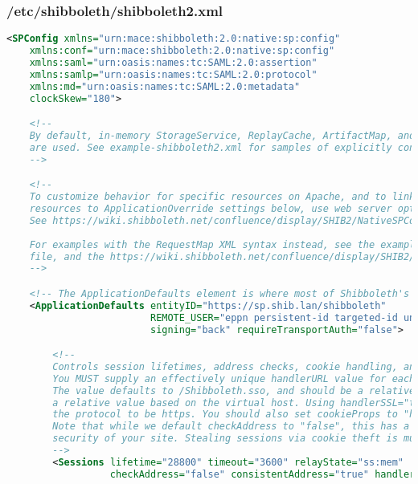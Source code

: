 \subsubsection{/etc/shibboleth/shibboleth2.xml}
\begin{lstlisting}[language=xml]
<SPConfig xmlns="urn:mace:shibboleth:2.0:native:sp:config"
    xmlns:conf="urn:mace:shibboleth:2.0:native:sp:config"
    xmlns:saml="urn:oasis:names:tc:SAML:2.0:assertion"
    xmlns:samlp="urn:oasis:names:tc:SAML:2.0:protocol"    
    xmlns:md="urn:oasis:names:tc:SAML:2.0:metadata"
    clockSkew="180">

    <!--
    By default, in-memory StorageService, ReplayCache, ArtifactMap, and SessionCache
    are used. See example-shibboleth2.xml for samples of explicitly configuring them.
    -->

    <!--
    To customize behavior for specific resources on Apache, and to link vhosts or
    resources to ApplicationOverride settings below, use web server options/commands.
    See https://wiki.shibboleth.net/confluence/display/SHIB2/NativeSPConfigurationElements for help.
    
    For examples with the RequestMap XML syntax instead, see the example-shibboleth2.xml
    file, and the https://wiki.shibboleth.net/confluence/display/SHIB2/NativeSPRequestMapHowTo topic.
    -->

    <!-- The ApplicationDefaults element is where most of Shibboleth's SAML bits are defined. -->
    <ApplicationDefaults entityID="https://sp.shib.lan/shibboleth"
                         REMOTE_USER="eppn persistent-id targeted-id uniqueID"
                         signing="back" requireTransportAuth="false">

        <!--
        Controls session lifetimes, address checks, cookie handling, and the protocol handlers.
        You MUST supply an effectively unique handlerURL value for each of your applications.
        The value defaults to /Shibboleth.sso, and should be a relative path, with the SP computing
        a relative value based on the virtual host. Using handlerSSL="true", the default, will force
        the protocol to be https. You should also set cookieProps to "https" for SSL-only sites.
        Note that while we default checkAddress to "false", this has a negative impact on the
        security of your site. Stealing sessions via cookie theft is much easier with this disabled.
        -->
        <Sessions lifetime="28800" timeout="3600" relayState="ss:mem"
                  checkAddress="false" consistentAddress="true" handlerSSL="true" cookieProps="https">


\end{lstlisting}
